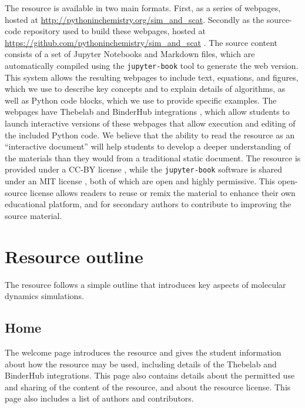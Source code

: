 \documentclass[amsmath,amssymb,twocolumn,superscriptaddress]{revtex4-1}
\begin{document}
The resource is available in two main formats. First, as a series of webpages, hosted at \url{http://pythoninchemistry.org/sim_and_scat}.
Secondly as the source-code repository used to build these webpages, hosted at \url{https://github.com/pythoninchemistry/sim_and_scat} \cite{mccluskey_pythoninchemistry/sim_and_scat_2019}.
The source content consists of a set of Jupyter Notebooks and Markdown files, which are automatically compiled using the \texttt{jupyter-book} tool \cite{lau_jupyter/jupyter-book_2019} to generate the web version.
This system allows the resulting webpages to include text, equations, and figures, which we use to describe key concepts and to explain details of algorithms, as well as Python code blocks, which we use to provide specific examples. The webpages have Thebelab and BinderHub integrations \cite{ragan-kelley_minrk/thebelab_2019, ragan-kelley_jupyterhub/binderhub_2019, jupyter_binder_2018}, which allow students to launch interactive versions of these webpages that allow execution and editing of the included Python code.
We believe that the ability to read the resource as an ``interactive document'' will help students to develop a deeper understanding of the materials than they would from a traditional static document.
The resource is provided under a CC-BY license \cite{noauthor_creative_2019}, while the \texttt{jupyter-book} software is shared under an MIT license \cite{noauthor_mit_2019}, both of which are open and highly permissive.
This open-source license allows readers to reuse or remix the material to enhance their own educational platform, and for secondary authors to contribute to improving the source material.

\section{Resource outline}

The resource follows a simple outline that introduces key aspects of molecular dynamics simulations.

\subsection{Home}

The welcome page introduces the resource and gives the student information about how the resource may be used, including details of the Thebelab and BinderHub integrations.
This page also contains details about the permitted use and sharing of the content of the resource, and about the resource license.
This page also includes a list of authors and contributors.
\end{document}
